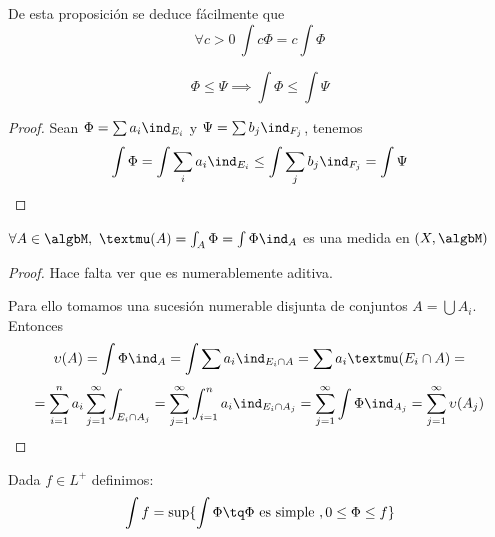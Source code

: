 \documentclass{apuntes}
\begin{document}
De esta proposición se deduce fácilmente que
\[\forall c > 0 \ \int c\Phi = c\int \Phi\]

\newpage
\begin{prop}
\[\Phi \leq \Psi \implies \int \Phi \leq \int \Psi\]
\end{prop}
\begin{proof}
Sean $\Phi = \sum a_i \ind_{E_i}$ y $\Psi  = \sum b_j \ind_{F_j}$, tenemos
\[\int \Phi = \int \sum_i a_i \ind_{E_i} \leq \int \sum_j b_j \ind_{F_j} = \int \Psi\]
\end{proof}

\begin{prop}
$\forall A \in \algbM, \ µ(A) = \int_A \Phi = \int \Phi \ind_A$ es una medida en $(X, \algbM)$
\end{prop}
\begin{proof}
Hace falta ver que es numerablemente aditiva.

Para ello tomamos una sucesión numerable disjunta de conjuntos $A=\bigcup A_i$.
Entonces
\[\upsilon(A) = \int \Phi \ind_A = \int \sum a_i \ind_{E_i \cap A} = \sum a_i µ(E_i \cap A) = \]
\[= \sum_{i=1}^n a_i \sum_{j=1}^{\infty}\int_{E_i \cap A_j} = \sum_{j=1}^{\infty}\int_{i=1}^n a_i \ind_{E_i \cap A_j} = \sum_{j=1}^{\infty} \int \Phi \ind_{A_j} = \sum_{j=1}^{\infty} \upsilon(A_j)\]
\end{proof}

\begin{defn}
Dada $f \in L^+$ definimos:
\[\int f = \sup\lbrace\int \Phi \tq \Phi \text{ es simple }, 0 \leq \Phi \leq f\rbrace\]
\end{defn}
\end{document}
